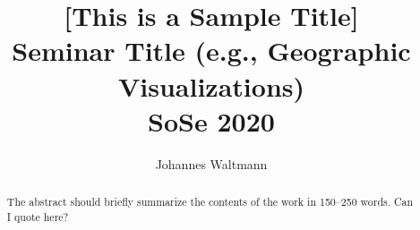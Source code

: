 \documentclass[runningheads]{llncs}
\begin{document}
%
\title{[This is a Sample Title] \\
Seminar Title (e.g., Geographic Visualizations) \\ SoSe 2020}
%
%
\author{Johannes Waltmann}
%
%
%
\maketitle              %
%
\begin{abstract}
The abstract should briefly summarize the contents of the work in
150--250 words.
Can I quote here?

\end{abstract}



%
%
%
 
 
%
\end{document}
